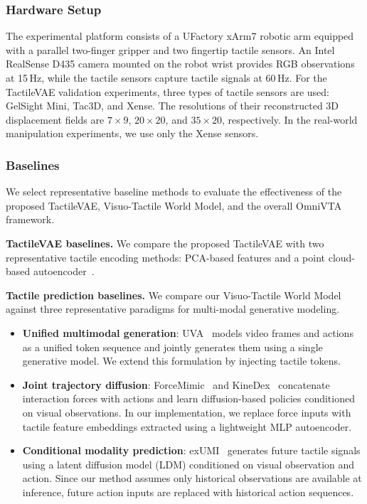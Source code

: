\subsubsection{Hardware Setup}

The experimental platform consists of a UFactory xArm7 robotic arm equipped with a parallel two-finger gripper and two fingertip tactile sensors. 
An Intel RealSense D435 camera mounted on the robot wrist provides RGB observations at 15\,Hz, while the tactile sensors capture tactile signals at 60\,Hz. For the TactileVAE validation experiments, three types of tactile sensors are used: GelSight Mini, Tac3D, and Xense. 
The resolutions of their reconstructed 3D displacement fields are $7\times9$, $20\times20$, and $35\times20$, respectively. 
In the real-world manipulation experiments, we use only the Xense sensors.

\subsubsection{Baselines}
We select representative baseline methods to evaluate the effectiveness of the proposed TactileVAE, Visuo-Tactile World Model, and the overall OmniVTA framework. 

\noindent \textbf{TactileVAE baselines.} We compare the proposed TactileVAE with two representative tactile encoding methods: PCA-based features and a point cloud-based autoencoder~\cite{chen2024general}.

\noindent \textbf{Tactile prediction baselines.}
We compare our Visuo-Tactile World Model against three representative paradigms for multi-modal generative modeling.

\begin{itemize}
\item \textbf{Unified multimodal generation}:
UVA~\cite{li2025unified} models video frames and actions as a unified token sequence and jointly generates them using a single generative model. We extend this formulation by injecting tactile tokens.

\item \textbf{Joint trajectory diffusion}:
ForceMimic~\cite{liu2025forcemimic} and KineDex~\cite{zhang2025kinedex} concatenate interaction forces with actions and learn diffusion-based policies conditioned on visual observations. In our implementation, we replace force inputs with tactile feature embeddings extracted using a lightweight MLP autoencoder.

\item \textbf{Conditional modality prediction}:
exUMI~\cite{xu2025exumi} generates future tactile signals using a latent diffusion model (LDM) conditioned on visual observation and action. Since our method assumes only historical observations are available at inference, future action inputs are replaced with historical action sequences.
\end{itemize}

